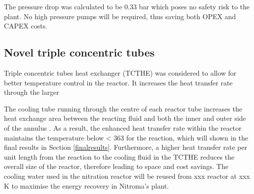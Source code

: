 The pressure drop was calculated to be 0.33 bar which poses no safety risk to the plant. No high pressure pumps will be required, thus saving both OPEX and CAPEX costs.


\subsection{Novel triple concentric tubes}
\label{sec:tripleconctube}
Triple concentric tubes heat exchanger (TCTHE) was considered to allow for better temperature control in the reactor. 
It increases the heat transfer rate through the larger 

The cooling tube running through the centre of each reactor tube increases the heat exchange area between the reacting fluid and both the inner and outer side of the annulus \cite{moya-rico_characterization_2019}. As a result, the enhanced heat transfer rate within the reactor maintains the temperature below \SI{< 363}{\Kelvin} for the reaction, which will shown in the final results in Section \ref{finalresults}. Furthermore, a higher heat transfer rate per unit length from the reaction to the cooling fluid in the TCTHE reduces the overall size of the reactor, therefore leading to space and cost savings. The cooling water used in the nitration reactor will be reused from xxx reactor at xxx K to maximise the energy recovery in Nitroma's plant. 


